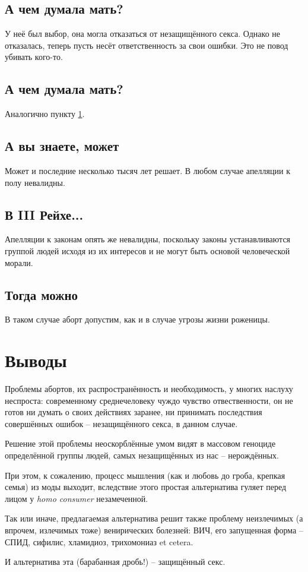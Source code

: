 \documentclass[a4paper,12pt]{report}
\begin{document}
    \section{А чем думала мать?}\label{thing-about-it}
        У неё был выбор, она могла отказаться от незащищённого секса. Однако не отказалась, 
        теперь пусть несёт ответственность за свои ошибки. Это не повод убивать кого-то.
	\section{А чем думала мать?}
        Аналогично пункту \ref{thing-about-it}.
    \section{А вы знаете, может}
        Может и последние несколько тысяч лет решает. В любом случае апелляции к полу невалидны.
    \section{В III Рейхе...}\label{laws}
        Апелляции к законам опять же невалидны, поскольку законы устанавливаются группой 
        людей исходя из их интересов и не могут быть основой человеческой морали. 
	\section{Тогда можно}
        В таком случае аборт допустим, как и в случае угрозы жизни роженицы.


\chapter{Выводы}
Проблемы абортов, их распространённость и необходимость, у многих наслуху неспроста: 
современному среднечеловеку чуждо чувство отвественности, он не готов ни думать о 
своих действиях заранее, ни принимать последствия совершённых ошибок -- незащищённого 
секса, в данном случае.

Решение этой проблемы неоскорблённые умом видят в массовом геноциде определённой 
группы людей, самых незащищённых из нас --  нерождённых. 

При этом, к сожалению, процесс мышления (как и любовь до гроба, крепкая семья) из 
моды выходит, вследствие этого простая альтернатива гуляет перед лицом у \textit{homo consumer} 
незамеченной. 

Так или иначе, предлагаемая альтернатива решит также проблему неизлечимых (а впрочем, 
излечимых тоже) венирических болезней: ВИЧ, его запущенная форма -- СПИД, 
сифилис, хламидиоз, трихомониаз et cetera.

И альтернатива эта (барабанная дробь!) -- защищённый секс.
\end{document}
